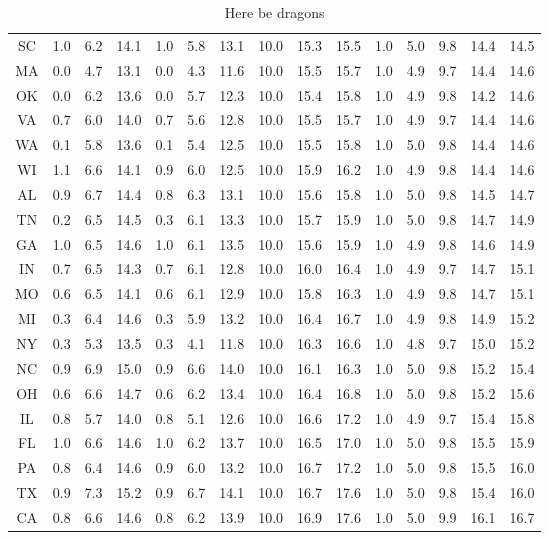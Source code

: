 \documentclass[nips13submit_09,times,art10]{article} %
\begin{document}
\begin{table}[ht]
\begin{tabular}{|c|rrr|rrr|rrr|rrrrr|}
  SC & 1.0 & 6.2 & 14.1 & 1.0 & 5.8 & 13.1 & 10.0 & 15.3 & 15.5 & 1.0 & 5.0 & 9.8 & 14.4 & 14.5 \\
  MA & 0.0 & 4.7 & 13.1 & 0.0 & 4.3 & 11.6 & 10.0 & 15.5 & 15.7 & 1.0 & 4.9 & 9.7 & 14.4 & 14.6 \\
  OK & 0.0 & 6.2 & 13.6 & 0.0 & 5.7 & 12.3 & 10.0 & 15.4 & 15.8 & 1.0 & 4.9 & 9.8 & 14.2 & 14.6 \\
  VA & 0.7 & 6.0 & 14.0 & 0.7 & 5.6 & 12.8 & 10.0 & 15.5 & 15.7 & 1.0 & 4.9 & 9.7 & 14.4 & 14.6 \\
  WA & 0.1 & 5.8 & 13.6 & 0.1 & 5.4 & 12.5 & 10.0 & 15.5 & 15.8 & 1.0 & 5.0 & 9.8 & 14.4 & 14.6 \\
  WI & 1.1 & 6.6 & 14.1 & 0.9 & 6.0 & 12.5 & 10.0 & 15.9 & 16.2 & 1.0 & 4.9 & 9.8 & 14.4 & 14.6 \\
  AL & 0.9 & 6.7 & 14.4 & 0.8 & 6.3 & 13.1 & 10.0 & 15.6 & 15.8 & 1.0 & 5.0 & 9.8 & 14.5 & 14.7 \\
  TN & 0.2 & 6.5 & 14.5 & 0.3 & 6.1 & 13.3 & 10.0 & 15.7 & 15.9 & 1.0 & 5.0 & 9.8 & 14.7 & 14.9 \\
  GA & 1.0 & 6.5 & 14.6 & 1.0 & 6.1 & 13.5 & 10.0 & 15.6 & 15.9 & 1.0 & 4.9 & 9.8 & 14.6 & 14.9 \\
  IN & 0.7 & 6.5 & 14.3 & 0.7 & 6.1 & 12.8 & 10.0 & 16.0 & 16.4 & 1.0 & 4.9 & 9.7 & 14.7 & 15.1 \\
  MO & 0.6 & 6.5 & 14.1 & 0.6 & 6.1 & 12.9 & 10.0 & 15.8 & 16.3 & 1.0 & 4.9 & 9.8 & 14.7 & 15.1 \\
  MI & 0.3 & 6.4 & 14.6 & 0.3 & 5.9 & 13.2 & 10.0 & 16.4 & 16.7 & 1.0 & 4.9 & 9.8 & 14.9 & 15.2 \\
  NY & 0.3 & 5.3 & 13.5 & 0.3 & 4.1 & 11.8 & 10.0 & 16.3 & 16.6 & 1.0 & 4.8 & 9.7 & 15.0 & 15.2 \\
  NC & 0.9 & 6.9 & 15.0 & 0.9 & 6.6 & 14.0 & 10.0 & 16.1 & 16.3 & 1.0 & 5.0 & 9.8 & 15.2 & 15.4 \\
  OH & 0.6 & 6.6 & 14.7 & 0.6 & 6.2 & 13.4 & 10.0 & 16.4 & 16.8 & 1.0 & 5.0 & 9.8 & 15.2 & 15.6 \\
  IL & 0.8 & 5.7 & 14.0 & 0.8 & 5.1 & 12.6 & 10.0 & 16.6 & 17.2 & 1.0 & 4.9 & 9.7 & 15.4 & 15.8 \\
  FL & 1.0 & 6.6 & 14.6 & 1.0 & 6.2 & 13.7 & 10.0 & 16.5 & 17.0 & 1.0 & 5.0 & 9.8 & 15.5 & 15.9 \\
  PA & 0.8 & 6.4 & 14.6 & 0.9 & 6.0 & 13.2 & 10.0 & 16.7 & 17.2 & 1.0 & 5.0 & 9.8 & 15.5 & 16.0 \\
  TX & 0.9 & 7.3 & 15.2 & 0.9 & 6.7 & 14.1 & 10.0 & 16.7 & 17.6 & 1.0 & 5.0 & 9.8 & 15.4 & 16.0 \\
  CA & 0.8 & 6.6 & 14.6 & 0.8 & 6.2 & 13.9 & 10.0 & 16.9 & 17.6 & 1.0 & 5.0 & 9.9 & 16.1 & 16.7 \\
   \hline
\end{tabular}
\label{tab:entropyStates}
\caption{Here be dragons}
\end{table}
\end{document}
